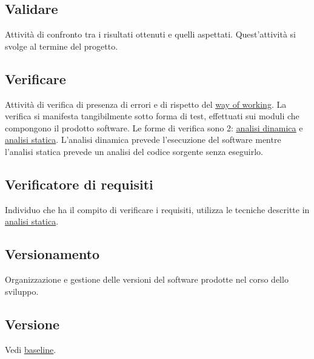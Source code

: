 	\subsection{Validare}
	\label{sec:validare}
	Attività di confronto tra i risultati ottenuti e quelli aspettati. Quest'attività si svolge al termine del progetto.
	
	\subsection{Verificare}
	\label{sec:verificare}
	Attività di verifica di presenza di errori e di rispetto del \underline{\hyperref[sec:wow]{way of working}}. La verifica si manifesta tangibilmente sotto forma di test, effettuati sui moduli che compongono il prodotto software. Le forme di verifica sono 2: \hyperref[sec:analisidinamica]{\underline{analisi dinamica}} e \hyperref[sec:analisistatica]{\underline{analisi statica}}. L'analisi dinamica prevede l'esecuzione del software mentre l'analisi statica prevede un analisi del codice sorgente senza eseguirlo. 
	
	\subsection{Verificatore di requisiti}
	\label{sec:verificatorerequisiti}
	Individuo che ha il compito di verificare i requisiti, utilizza le tecniche descritte in \underline{\hyperref[sec:analisistatica]{analisi statica}}.
	
	\subsection{Versionamento}
	\label{sec:versionamento}
	Organizzazione e gestione delle versioni del software prodotte nel corso dello sviluppo.

	\subsection{Versione}
	\label{sec:versione}
	Vedi \underline{\hyperref[sec:baseline]{baseline}}. \newpage

